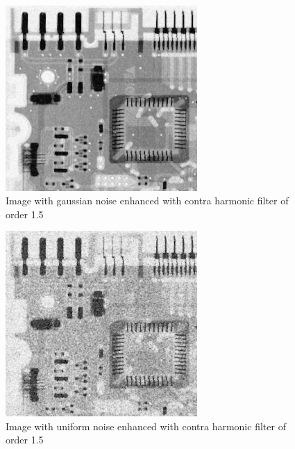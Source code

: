 \documentclass[10pt]{article}
\begin{document}
\begin{figure}[!ht]
	\centering
	\includegraphics[height=200pt]{./ex4/gaussch15.jpg}
	\caption{Image with gaussian noise enhanced with contra harmonic filter of order 1.5}
\end{figure}
\begin{figure}[!ht]
	\centering
	\includegraphics[height=200pt]{./ex4/unich15.jpg}
	\caption{Image with uniform noise enhanced with contra harmonic filter of order 1.5}
\end{figure}
\end{document}
